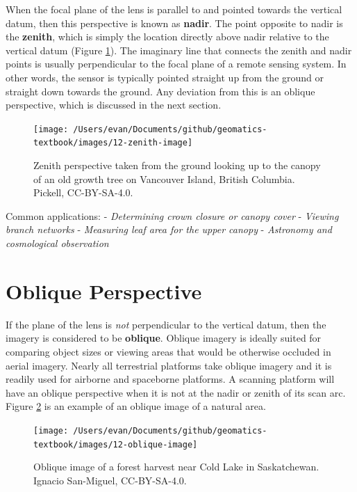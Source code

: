 \documentclass[
]{book}
\begin{document}
When the focal plane of the lens is parallel to and pointed towards the vertical datum, then this perspective is known as \textbf{nadir}. The point opposite to nadir is the \textbf{zenith}, which is simply the location directly above nadir relative to the vertical datum (Figure \ref{fig:12-zenith-image}). The imaginary line that connects the zenith and nadir points is usually perpendicular to the focal plane of a remote sensing system. In other words, the sensor is typically pointed straight up from the ground or straight down towards the ground. Any deviation from this is an oblique perspective, which is discussed in the next section.

\begin{figure}
\texttt{[image: /Users/evan/Documents/github/geomatics-textbook/images/12-zenith-image]} \caption{Zenith perspective taken from the ground looking up to the canopy of an old growth tree on Vancouver Island, British Columbia. Pickell, CC-BY-SA-4.0.}\label{fig:12-zenith-image}
\end{figure}

Common applications:
- \emph{Determining crown closure or canopy cover}
- \emph{Viewing branch networks}
- \emph{Measuring leaf area for the upper canopy}
- \emph{Astronomy and cosmological observation}

\hypertarget{oblique-perspective}{%
\section{Oblique Perspective}\label{oblique-perspective}}

If the plane of the lens is \emph{not} perpendicular to the vertical datum, then the imagery is considered to be \textbf{oblique}. Oblique imagery is ideally suited for comparing object sizes or viewing areas that would be otherwise occluded in aerial imagery. Nearly all terrestrial platforms take oblique imagery and it is readily used for airborne and spaceborne platforms. A scanning platform will have an oblique perspective when it is not at the nadir or zenith of its scan arc. Figure \ref{fig:12-oblique-image} is an example of an oblique image of a natural area.

\begin{figure}
\texttt{[image: /Users/evan/Documents/github/geomatics-textbook/images/12-oblique-image]} \caption{Oblique image of a forest harvest near Cold Lake in Saskatchewan. Ignacio San-Miguel, CC-BY-SA-4.0.}\label{fig:12-oblique-image}
\end{figure}
\end{document}
